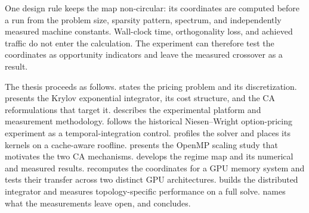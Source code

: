 One design rule keeps the map non-circular: its coordinates are computed before a run from the problem size, sparsity pattern, spectrum, and independently measured machine constants. Wall-clock time, orthogonality loss, and achieved traffic do not enter the calculation. The experiment can therefore test the coordinates as opportunity indicators and leave the measured crossover as a result.

The thesis proceeds as follows.  states the pricing problem and its discretization.  presents the Krylov exponential integrator, its cost structure, and the CA reformulations that target it.  describes the experimental platform and measurement methodology.  follows the historical Niesen--Wright option-pricing experiment as a temporal-integration control.  profiles the solver and places its kernels on a cache-aware roofline.  presents the OpenMP scaling study that motivates the two CA mechanisms.  develops the regime map and its numerical and measured results.  recomputes the coordinates for a GPU memory system and tests their transfer across two distinct GPU architectures.  builds the distributed integrator and measures topology-specific performance on a full solve.  names what the measurements leave open, and  concludes.
